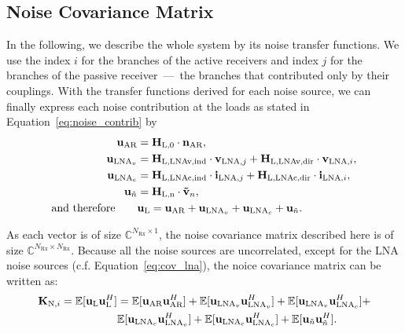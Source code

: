 \subsection{Noise Covariance Matrix}
\label{sec:sig_cov}
In the following, we describe the whole system by its noise transfer functions.
We use the index $i$ for the branches of the active receivers and index $j$ for the branches of the passive receiver~---~the branches that contributed only by their couplings.
With the transfer functions derived for each noise source, we can finally express each noise contribution at the loads as stated in Equation~\eqref{eq:noise_contrib} by
\begin{align}
\label{eq:noise_output}
\nonumber
\mathbf{u}_\text{AR} &= \mathbf{H}_\text{L,0}\cdot\mathbf{n}_\text{AR},\\\nonumber 
\mathbf{u}_{\text{LNA}_v} &= 
	\mathbf{H}_\text{L,LNAv,ind}\cdot\mathbf{v}_{\text{LNA},j}+
	\mathbf{H}_\text{L,LNAv,dir}\cdot\mathbf{v}_{\text{LNA},i},\\\nonumber
\mathbf{u}_{\text{LNA}_c} &= 
	\mathbf{H}_\text{L,LNAc,ind}\cdot\mathbf{i}_{\text{LNA},j}+
	\mathbf{H}_\text{L,LNAc,dir}\cdot\mathbf{i}_{\text{LNA},i},\\\nonumber
\mathbf{u}_{\tilde{n}} &= \mathbf{H}_\text{L,n}\cdot\mathbf{\tilde{v}}_{n},\\
\text{and therefore}\qquad &\mathbf{u}_\text{L} = \mathbf{u}_\text{AR} + \mathbf{u}_{\text{LNA}_v} + \mathbf{u}_{\text{LNA}_c} + \mathbf{u}_{\tilde{n}}.
\end{align}

As each vector is of size $\mathbb{C}^{ N_\text{Rx}\times 1}$, the noise covariance matrix described here is of size $\mathbb{C}^{ N_\text{Rx}\times N_\text{Rx}}$.
Because all the noise sources are uncorrelated, except for the LNA noise sources (c.f. Equation~\eqref{eq:cov_lna}), the noice covariance matrix can be written as:
\begin{align}
\label{eq:exp_noise}\nonumber
\mat{K}_{\text{N,}i} =\mathbb{E}[\vec{u}_\text{L}\vec{u}_\text{L}^H] &=
\mathbb{E}[\vec{u}_\text{AR}\vec{u}_\text{AR}^H]+ 
\mathbb{E}[\vec{u}_{\text{LNA}_v}\vec{u}_{\text{LNA}_v}^H] +
\mathbb{E}[\vec{u}_{\text{LNA}_v}\vec{u}_{\text{LNA}_c}^H] +\\%
\quad&\mathbb{E}[\vec{u}_{\text{LNA}_c}\vec{u}_{\text{LNA}_v}^H] +
\mathbb{E}[\vec{u}_{\text{LNA}_c}\vec{u}_{\text{LNA}_c}^H] +
\mathbb{E}[\vec{u}_{\tilde{n}}\vec{u}_{\tilde{n}}^H].
\end{align}

